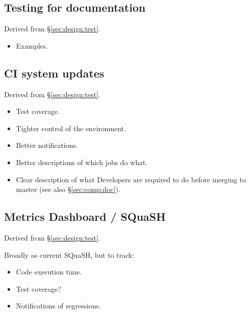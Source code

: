 \subsection{Testing for documentation}

Derived from \S\ref{sec:design:test}.


\begin{itemize}

  \item{Examples.}

\end{itemize}

\subsection{CI system updates}
\label{sec:comp:ci}

Derived from \S\ref{sec:design:test}.


\begin{itemize}

  \item{Test coverage.}
  \item{Tighter control of the environment.}
  \item{Better notifications.}
  \item{Better descriptions of which jobs do what.}
  \item{Clear description of what Developers are required to do before merging
  to master (see also \S\ref{sec:comp:doc}).}

\end{itemize}


\subsection{Metrics Dashboard / SQuaSH}

Derived from \S\ref{sec:design:test}.


Broadly as current SQuaSH, but to track:

\begin{itemize}

  \item{Code execution time.}
  \item{Test coverage?}
  \item{Notifications of regressions.}

\end{itemize}


